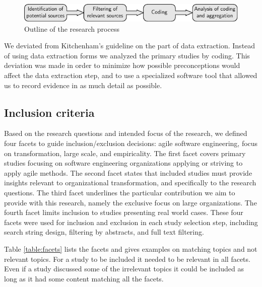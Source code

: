 \begin{figure}
  \begin{center}
    \includegraphics[width=1\textwidth]{graphics/research_process.pdf}
    \caption{Outline of the research process}
    \label{fig:researchprocess}
  \end{center}
\end{figure}

We deviated from Kitchenham's guideline on the part of data extraction. Instead
of using data extraction forms we analyzed the primary studies by coding. This
deviation was made in order to minimize how possible preconceptions would affect
the data extraction step, and to use a specialized software tool that allowed us
to record evidence in as much detail as possible.

\subsection{Inclusion criteria}
\label{sec:inclusioncriteria}

Based on the research questions and intended focus of the research, we defined
four facets to guide inclusion/exclusion decisions: agile software engineering,
focus on transformation, large scale, and empiricality. The first facet covers
primary studies focusing on software engineering organizations applying or
striving to apply agile methods. The second facet states that included studies
must provide insights relevant to organizational transformation, and
specifically to the research questions. The third facet underlines the
particular contribution we aim to provide with this research, namely the
exclusive focus on large organizations. The fourth facet limits inclusion to
studies presenting real world cases. These four facets were used for inclusion
and exclusion in each study selection step, including search string design,
filtering by abstracts, and full text filtering.

Table \ref{table:facets} lists the facets and gives examples on matching topics
and not relevant topics. For a study to be included it needed to be relevant
in all facets. Even if a study discussed some of the irrelevant topics it could
be included as long as it had some content matching all the facets.

